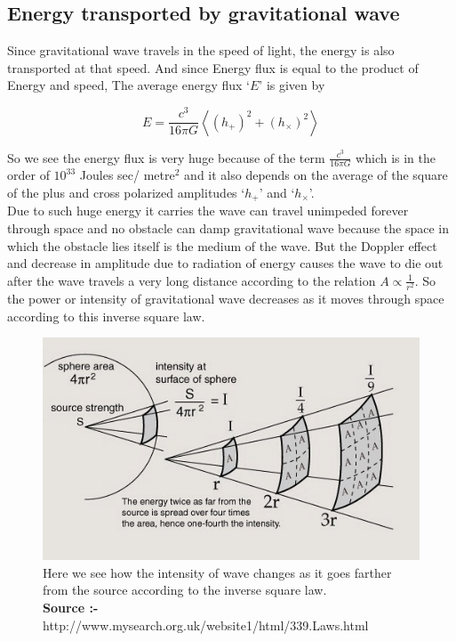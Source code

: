 \subsection{Energy transported by gravitational wave}

Since gravitational wave travels in the speed of light, the energy is also transported at that speed. And since Energy flux is equal to the product of Energy and speed, The average energy flux `$E$' is given by

\begin{equation}
    E = \frac{c^{3}}{16\pi G} \left \langle (h_{+})^{2} + (h_{\times})^{2} \right \rangle 
\end{equation}

So we see the energy flux is very huge because of the term $\frac{c^{3}}{16 \pi G}$ which is in the order of $10^{33}$ Joules sec/ metre$^2$  and it also depends on the average of the square of the plus and cross polarized amplitudes `$h_{+}$' and `$h_{\times}$'. \\

Due to such huge energy it carries the wave can travel unimpeded forever through space and no obstacle can damp gravitational wave because the space in which the obstacle lies itself is the medium of the wave. But the Doppler effect and decrease in amplitude due to radiation of energy causes the wave to die out after the wave travels a very long distance according to the relation $A \propto \frac{1}{r^2}$\:. So the power or intensity of gravitational wave decreases as it moves through space according to this inverse square law. 

\begin{figure}[h]
    \centering
    \includegraphics[scale=0.915]{images.tex/inverse_square.jpeg}
    \caption{ Here we see how the intensity of wave changes as it goes farther from the source according to the inverse square law.\\
    \textbf{Source :-} http://www.mysearch.org.uk/website1/html/339.Laws.html}
\end{figure}